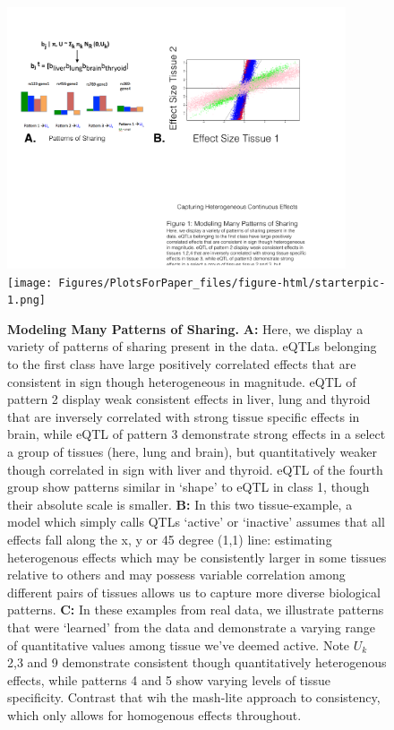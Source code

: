 \newline
\begin{figure}[htbp]
\includegraphics[width=10cm]{Figures/Patterns.pdf}\\
\texttt{[image: Figures/PlotsForPaper\_files/figure-html/starterpic-1.png]}
\caption{\textbf{Modeling Many Patterns of Sharing.} \textbf{A:} Here, we display a variety of patterns of sharing present in the data. eQTLs belonging to the first class have large positively correlated effects that are consistent in sign though heterogeneous in magnitude. eQTL of pattern 2 display weak consistent effects in liver, lung and thyroid that are inversely correlated with strong tissue specific effects in brain, while eQTL of pattern 3 demonstrate strong effects in a select a group of tissues (here, lung and brain), but quantitatively weaker though correlated in sign with liver and thyroid. eQTL of the fourth group show patterns similar in `shape' to eQTL in class 1, though their absolute scale is smaller. \textbf{B:} In this two tissue-example, a model which simply calls QTLs `active' or `inactive' assumes that all effects fall along the x, y or 45 degree (1,1) line: estimating heterogenous effects which may be consistently larger in some tissues relative to others and may possess variable correlation among different pairs of tissues allows us to capture more diverse biological patterns. \textbf{C:} In these examples from real data, we illustrate patterns that were `learned' from the data and demonstrate a varying range of quantitative values among tissue we've deemed active. Note $U_{k}$ 2,3 and 9 demonstrate consistent though quantitatively heterogenous effects, while patterns 4 and 5 show varying levels of tissue specificity. Contrast that wih the mash-lite approach to consistency, which only allows for homogenous effects throughout.}
\label{fig:Patterns}
\end{figure}
\newline


